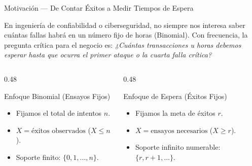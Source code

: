 \documentclass[10pt, aspectratio=169]{beamer}
\begin{document}
\begin{frame}{Motivación — De Contar Éxitos a Medir Tiempos de Espera}
  \footnotesize
  \begin{motivacion}
    En ingeniería de confiabilidad o ciberseguridad, no siempre nos interesa saber cuántas fallas habrá en un número fijo de horas (Binomial). Con frecuencia, la pregunta crítica para el negocio es: \emph{¿Cuántas transacciones u horas debemos esperar hasta que ocurra el primer ataque o la cuarta falla crítica?}
  \end{motivacion}
  
  \vspace{0.15cm}
  \pause
  \begin{columns}[T]
    \begin{column}{0.48\textwidth}
      \begin{block}{Enfoque Binomial (Ensayos Fijos)}
        \scriptsize
        \begin{itemize}\itemsep=0.06cm
          \item Fijamos el total de intentos $n$.
          \item $X = \text{éxitos observados}$ ($X \le n$).
          \item Soporte finito: $\{0, 1, \dots, n\}$.
        \end{itemize}
      \end{block}
    \end{column}
    \begin{column}{0.48\textwidth}
      \begin{alertblock}{Enfoque de Espera (Éxitos Fijos)}
        \scriptsize
        \begin{itemize}\itemsep=0.06cm
          \item Fijamos la meta de éxitos $r$.
          \item $X = \text{ensayos necesarios}$ ($X \ge r$).
          \item Soporte infinito numerable: $\{r, r+1, \dots\}$.
        \end{itemize}
      \end{alertblock}
    \end{column}
  \end{columns}
\end{frame}
\end{document}
